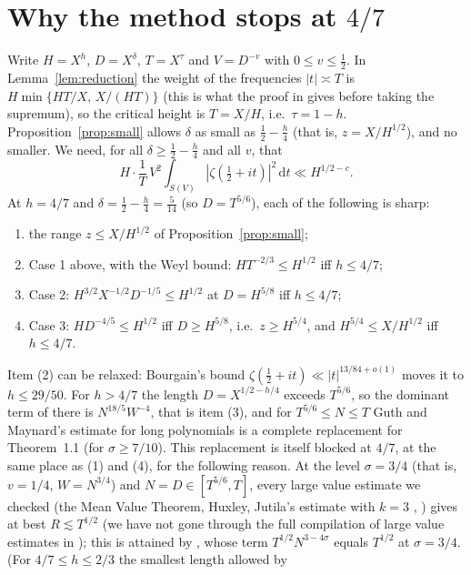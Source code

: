\documentclass[11pt]{amsart}
\theoremstyle{remark}
\newcommand{\dd}{\,\mathrm{d}}
\begin{document}
\section{Why the method stops at $4/7$}\label{sec:limits}

Write $H=X^h$, $D=X^\delta$, $T=X^\tau$ and $V=D^{-v}$ with $0\le v\le\frac12$.  In
Lemma~\ref{lem:reduction} the weight of the frequencies $|t|\asymp T$ is
$H\min\{HT/X,\,X/(HT)\}$ (this is what the proof in \cite{GMRR} gives before
taking the supremum), so the critical height is $T=X/H$, i.e.\ $\tau=1-h$.
Proposition~\ref{prop:small} allows $\delta$ as small as $\frac12-\frac h4$
(that is, $z=X/H^{1/2}$), and no smaller.  We need, for all $\delta\ge\frac12-\frac h4$ and
all $v$, that
\[
  H\cdot\frac1T\,V^2\int_{S(V)}|\zeta(\tfrac12+it)|^2\dd t\ll H^{1/2-c}.
\]
At $h=4/7$ and $\delta=\frac12-\frac h4=\frac5{14}$ (so $D=T^{5/6}$), each of the
following is sharp:
\begin{enumerate}
\item the range $z\le X/H^{1/2}$ of Proposition~\ref{prop:small};
\item Case 1 above, with the Weyl bound: $HT^{-2/3}\le H^{1/2}$ iff $h\le 4/7$;
\item Case 2: $H^{3/2}X^{-1/2}D^{-1/5}\le H^{1/2}$ at $D=H^{5/8}$ iff $h\le4/7$;
\item Case 3: $HD^{-4/5}\le H^{1/2}$ iff $D\ge H^{5/8}$, i.e.\ $z\ge H^{5/4}$, and
  $H^{5/4}\le X/H^{1/2}$ iff $h\le4/7$.
\end{enumerate}
Item (2) can be relaxed: Bourgain's bound
$\zeta(\frac12+it)\ll|t|^{13/84+o(1)}$ \cite{Bo} moves it to $h\le29/50$.  For
$h>4/7$ the length $D=X^{1/2-h/4}$ exceeds $T^{5/6}$, so the dominant term of
\cite[Theorem~1.1]{GM} there is $N^{18/5}W^{-4}$, that is item (3), and for
$T^{5/6}\le N\le T$ Guth and Maynard's estimate for long polynomials
\cite[Proposition~12.1]{GM} is a complete replacement for Theorem~1.1 (for
$\sigma\ge7/10$).  This replacement is itself blocked at $4/7$, at the same place as
(1) and (4), for the following reason.  At the level
$\sigma=3/4$ (that is, $v=1/4$, $W=N^{3/4}$) and $N=D\in[T^{5/6},T]$, every large value
estimate we checked (the Mean Value Theorem, Huxley, Jutila's estimate with $k=3$
\cite{Ju}, \cite[Theorem~1.1 and Proposition~12.1]{GM}) gives at best $R\lesssim T^{1/2}$
(we have not gone through the full compilation of large value estimates in
\cite{TTY});
this is attained by \cite[Proposition~12.1]{GM}, whose term $T^{1/2}N^{3-4\sigma}$
equals $T^{1/2}$ at $\sigma=3/4$.  (For $4/7\le h\le2/3$ the smallest length allowed by
\end{document}
